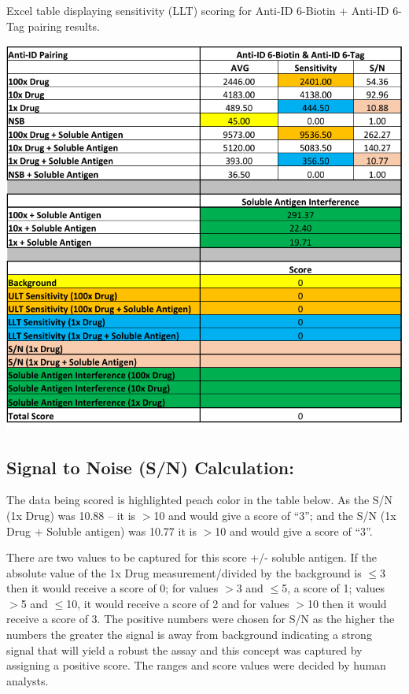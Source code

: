 \begin{table}[H]
 \centering
 \caption{Excel table displaying sensitivity (LLT) scoring for Anti-ID 6-Biotin + Anti-ID 6-Tag pairing results.}
 \includegraphics{graphics/ch3/Table_5.pdf}
\end{table} 

\subsection*{Signal to Noise (S/N) Calculation:}
The data being scored is highlighted peach color in the table below.  As the S/N (1x Drug) was 10.88 – it is $>$10 and would give a score of “3”; and the S/N (1x Drug + Soluble antigen) was 10.77 it is $>$10 and would give a score of “3”.

There are two values to be captured for this score +/- soluble antigen. If the absolute value of the 1x Drug measurement/divided by the background is $\leq$3 then it would receive a score of 0; for values $>$3 and $\leq$5, a score of 1; values $>$5 and $\leq$10, it would receive a score of 2 and for values $>$10 then it would receive a score of 3.  The positive numbers were chosen for S/N as the higher the numbers the greater the signal is away from background indicating a strong signal that will yield a robust the assay and this concept was captured by assigning a positive score.  The ranges and score values were decided by human analysts.

